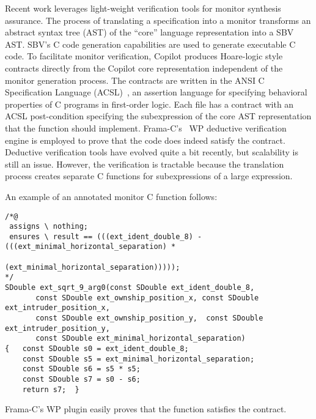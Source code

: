Recent work  leverages light-weight verification tools for monitor
synthesis assurance.   The process of translating a specification into a monitor
transforms an abstract syntax tree (AST) of the ``core'' language representation into a SBV
AST.  SBV's C code generation capabilities are used to generate 
executable C code.  To facilitate monitor verification, Copilot 
produces Hoare-logic style contracts directly from the Copilot core
representation independent of the monitor generation process. The
contracts are written in the ANSI C Specification Language
(ACSL)~\cite{baudin09acsl}, an assertion language for specifying
behavioral properties of C programs in first-order logic.  Each file has a contract  with an ACSL 
post-condition  specifying the subexpression of the core
AST representation that the function should  implement. 
Frama-C's~\cite{framac} WP deductive verification engine is employed
to prove that the code does indeed satisfy the contract. Deductive
verification tools have evolved quite a bit recently, but scalability
is still an issue. However, the verification is tractable because the  translation process creates separate C
functions for subexpressions of a large expression. 


An example of an annotated monitor C function follows: 

\begin{Verbatim}[fontsize=\scriptsize]
/*@
 assigns \ nothing;
 ensures \ result == (((ext_ident_double_8) - (((ext_minimal_horizontal_separation) *
                                 (ext_minimal_horizontal_separation)))));
*/
SDouble ext_sqrt_9_arg0(const SDouble ext_ident_double_8,
       const SDouble ext_ownship_position_x, const SDouble ext_intruder_position_x,
       const SDouble ext_ownship_position_y,  const SDouble ext_intruder_position_y,
       const SDouble ext_minimal_horizontal_separation)
{   const SDouble s0 = ext_ident_double_8;
    const SDouble s5 = ext_minimal_horizontal_separation;
    const SDouble s6 = s5 * s5;
    const SDouble s7 = s0 - s6;
    return s7;  }
\end{Verbatim}

\noindent
Frama-C's WP plugin easily proves that the function satisfies the
contract. 

